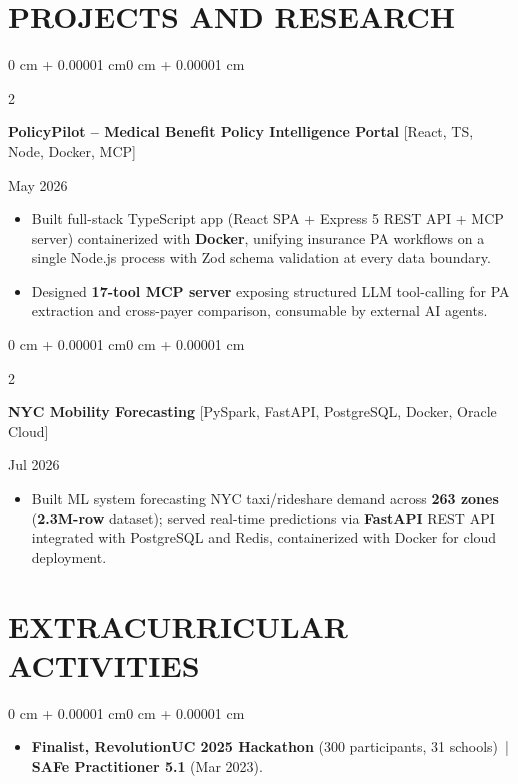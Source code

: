 \documentclass[10pt, letterpaper]{article}
\newenvironment{highlights}{
    \begin{itemize}[
        topsep=0.10 cm,
        parsep=0.06 cm,
        partopsep=0pt,
        itemsep=0.06 cm,
        leftmargin=12pt
    ]
}{
    \end{itemize}
}
\newenvironment{onecolentry}{
    \begin{adjustwidth}{0 cm + 0.00001 cm}{0 cm + 0.00001 cm}
}{
    \end{adjustwidth}
}
\newenvironment{twocolentry}[2][]{
    \onecolentry
    \def\secondColumn{#2}
    \setcolumnwidth{\fill, 4.5 cm}
    \begin{paracol}{2}
}{
    \switchcolumn \raggedleft \secondColumn
    \end{paracol}
    \endonecolentry
}
\begin{document}
\section{PROJECTS AND RESEARCH}
\begin{twocolentry}{May 2026}
\textbf{PolicyPilot -- Medical Benefit Policy Intelligence Portal} [React, TS, Node, Docker, MCP]
\end{twocolentry}
\begin{highlights}
  \item Built full-stack TypeScript app (React SPA + Express 5 REST API + MCP server) containerized with \textbf{Docker}, unifying insurance PA workflows on a single Node.js process with Zod schema validation at every data boundary.
  \item Designed \textbf{17-tool MCP server} exposing structured LLM tool-calling for PA extraction and cross-payer comparison, consumable by external AI agents.
\end{highlights}

\vspace{0.12 cm}

\begin{twocolentry}{Jul 2026}
\textbf{NYC Mobility Forecasting} [PySpark, FastAPI, PostgreSQL, Docker, Oracle Cloud]
\end{twocolentry}
\begin{highlights}
  \item Built ML system forecasting NYC taxi/rideshare demand across \textbf{263 zones} (\textbf{2.3M-row} dataset); served real-time predictions via \textbf{FastAPI} REST API integrated with PostgreSQL and Redis, containerized with Docker for cloud deployment.
\end{highlights}

\section{EXTRACURRICULAR ACTIVITIES}
\begin{onecolentry}
\begin{highlights}
  \item \textbf{Finalist, RevolutionUC 2025 Hackathon} (300 participants, 31 schools) \,|\, \textbf{SAFe Practitioner 5.1} (Mar 2023).
\end{highlights}
\end{onecolentry}
\end{document}
